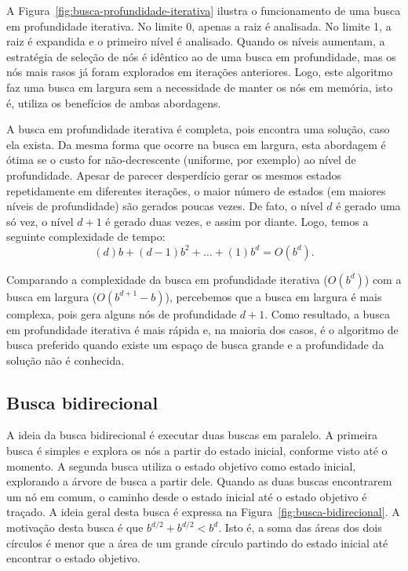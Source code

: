 
A Figura~\ref{fig:busca-profundidade-iterativa} ilustra o funcionamento de uma busca em profundidade iterativa. No limite 0, apenas a raiz é analisada. No limite 1, a raiz é expandida e o primeiro nível é analisado. Quando os níveis aumentam, a estratégia de seleção de nós é idêntico ao de uma busca em profundidade, mas os nós mais rasos já foram explorados em iterações anteriores. Logo, este algoritmo faz uma busca em largura sem a necessidade de manter os nós em memória, isto é, utiliza os benefícios de ambas abordagens.

A busca em profundidade iterativa é completa, pois encontra uma solução, caso ela exista. Da mesma forma que ocorre na busca em largura, esta abordagem é ótima se o custo for não-decrescente (uniforme, por exemplo) ao nível de profundidade. Apesar de parecer desperdício gerar os mesmos estados repetidamente em diferentes iterações, o maior número de estados (em maiores níveis de profundidade) são gerados poucas vezes. De fato, o nível $d$ é gerado uma só vez, o nível $d+1$ é gerado duas vezes, e assim por diante. Logo, temos a seguinte complexidade de tempo:
$$
(d)b + (d - 1)b^2 + \ldots + (1)b^d = O(b^d).
$$

Comparando a complexidade da busca em profundidade iterativa ($O(b^d)$) com a busca em largura ($O(b^{d+1} - b)$), percebemos que a busca em largura é mais complexa, pois gera alguns nós de profundidade $d+1$. Como resultado, a busca em profundidade iterativa é mais rápida e, na maioria dos casos, é o algoritmo de busca preferido quando existe um espaço de busca grande e a profundidade da solução não é conhecida.

\subsection{Busca bidirecional}

A ideia da busca bidirecional é executar duas buscas em paralelo. A primeira busca é simples e explora os nós a partir do estado inicial, conforme visto até o momento. A segunda busca utiliza o estado objetivo como estado inicial, explorando a árvore de busca a partir dele. Quando as duas buscas encontrarem um nó em comum, o caminho desde o estado inicial até o estado objetivo é traçado. A ideia geral desta busca é expressa na Figura~\ref{fig:busca-bidirecional}. A motivação desta busca é que $b^{d/2} + b^{d/2} < b^d$. Isto é, a soma das áreas dos dois círculos é menor que a área de um grande círculo partindo do estado inicial até encontrar o estado objetivo. 

